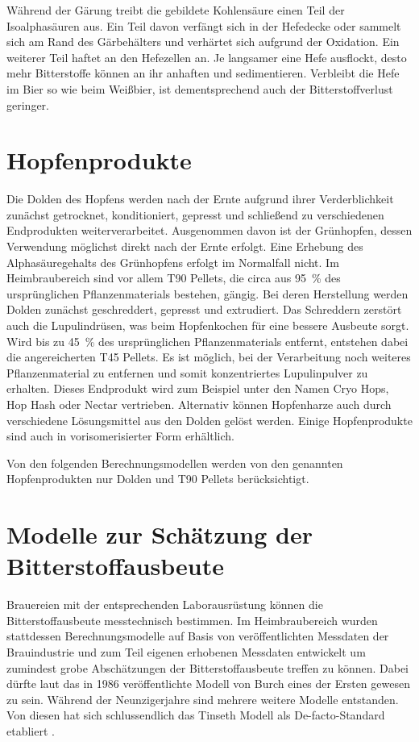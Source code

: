 \documentclass[a4paper,parskip=half]{scrartcl}
\begin{document}
Während der Gärung treibt die gebildete Kohlensäure einen Teil der Isoalphasäuren aus. Ein Teil davon verfängt sich in der Hefedecke oder sammelt sich am Rand des Gärbehälters und verhärtet sich aufgrund der Oxidation. Ein weiterer Teil haftet an den Hefezellen an. Je langsamer eine Hefe ausflockt, desto mehr Bitterstoffe können an ihr anhaften und sedimentieren. Verbleibt die Hefe im Bier so wie beim Weißbier, ist dementsprechend auch der Bitterstoffverlust geringer. \parencite[126]{Garetz1994} 

\section*{Hopfenprodukte}

Die Dolden des Hopfens werden nach der Ernte aufgrund ihrer Verderblichkeit zunächst getrocknet, konditioniert, gepresst und schließend zu verschiedenen Endprodukten weiterverarbeitet. Ausgenommen davon ist der Grünhopfen, dessen Verwendung möglichst direkt nach der Ernte erfolgt. Eine Erhebung des Alphasäuregehalts des Grünhopfens erfolgt im Normalfall nicht. Im Heimbraubereich sind vor allem T90 Pellets, die circa aus 95~\% des ursprünglichen Pflanzenmaterials bestehen, gängig. Bei deren Herstellung werden Dolden zunächst geschreddert, gepresst und extrudiert. Das Schreddern zerstört auch die Lupulindrüsen, was beim Hopfenkochen für eine bessere Ausbeute sorgt. Wird bis zu 45~\% des ursprünglichen Pflanzenmaterials entfernt, entstehen dabei die angereicherten T45 Pellets. Es ist möglich, bei der Verarbeitung noch weiteres Pflanzenmaterial zu entfernen und somit konzentriertes Lupulinpulver zu erhalten. Dieses Endprodukt wird zum Beispiel unter den Namen Cryo Hops, Hop Hash oder Nectar vertrieben. Alternativ können Hopfenharze auch durch verschiedene Lösungsmittel aus den Dolden gelöst werden. Einige Hopfenprodukte sind auch in vorisomerisierter Form erhältlich. \parencites[166-172]{Nottebohm2020}[80-90]{Garetz1994}

Von den folgenden Berechnungsmodellen werden von den genannten Hopfenprodukten nur Dolden und T90 Pellets berücksichtigt.

\section*{Modelle zur Schätzung der Bitterstoffausbeute}

Brauereien mit der entsprechenden Laborausrüstung können die Bitterstoffausbeute messtechnisch bestimmen. Im Heimbraubereich wurden stattdessen Berechnungsmodelle auf Basis von veröffentlichten Messdaten der Brauindustrie und zum Teil eigenen erhobenen Messdaten entwickelt um zumindest grobe Abschätzungen der Bitterstoffausbeute treffen zu können. Dabei dürfte laut \textcite{Bonham2001} das in 1986 veröffentlichte Modell von Burch eines der Ersten gewesen zu sein. Während der Neunzigerjahre sind mehrere weitere Modelle entstanden. Von diesen hat sich schlussendlich das Tinseth Modell als De-facto-Standard etabliert \parencite[185]{Hieronymus2012}.
\end{document}
